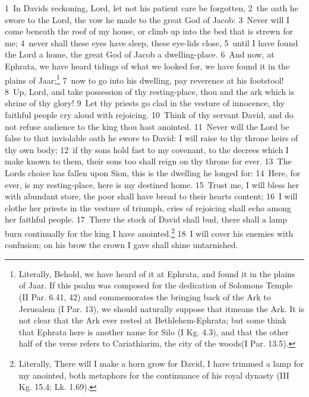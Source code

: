 \documentclass[10pt]{book} %
\begin{document}
\textcolor{benred8}{1}~In David\textquotesingle s reckoning, Lord, let not his patient care be forgotten, \textcolor{benred8}{2}~the oath he swore to the Lord, the vow he made to the great God of Jacob: \textcolor{benred8}{3}~Never will I come beneath the roof of my house, or climb up into the bed that is strewn for me; \textcolor{benred8}{4}~never shall these eyes have sleep, these eye-lids close, \textcolor{benred8}{5}~until I have found the Lord a home, the great God of Jacob a dwelling-place. \textcolor{benred8}{6}~And now, at Ephrata, we have heard tidings of what we looked for, we have found it in the plains of Jaar;\footnote[1]{Literally, \textasciigrave Behold, we have heard of it at Ephrata, and found it in the plains of Jaar\textquotesingle . If this psalm was composed for the dedication of Solomon\textquotesingle s Temple (II Par. 6.41, 42) and commemorates the bringing back of the Ark to Jerusalem (I Par. 13), we should naturally suppose that \textasciigrave it\textquotesingle  means the Ark. It is not clear that the Ark ever rested at Bethlehem-Ephrata; but some think that Ephrata here is another name for Silo (I Kg. 4.3), and that the other half of the verse refers to Cariathiarim, the \textasciigrave city of the woods\textquotesingle  (I Par. 13.5).} \textcolor{benred8}{7}~now to go into his dwelling, pay reverence at his footstool! \textcolor{benred8}{8}~Up, Lord, and take possession of thy resting-place, thou and the ark which is shrine of thy glory! \textcolor{benred8}{9}~Let thy priests go clad in the vesture of innocence, thy faithful people cry aloud with rejoicing.
\textcolor{benred8}{10}~Think of thy servant David, and do not refuse audience to the king thou hast anointed. \textcolor{benred8}{11}~Never will the Lord be false to that inviolable oath he swore to David: I will raise to thy throne heirs of thy own body; \textcolor{benred8}{12}~if thy sons hold fast to my covenant, to the decrees which I make known to them, their sons too shall reign on thy throne for ever. \textcolor{benred8}{13}~The Lord\textquotesingle s choice has fallen upon Sion, this is the dwelling he longed for: \textcolor{benred8}{14}~Here, for ever, is my resting-place, here is my destined home. \textcolor{benred8}{15}~Trust me, I will bless her with abundant store, the poor shall have bread to their heart\textquotesingle s content; \textcolor{benred8}{16}~I will clothe her priests in the vesture of triumph, cries of rejoicing shall echo among her faithful people. \textcolor{benred8}{17}~There the stock of David shall bud, there shall a lamp burn continually for the king I have anointed.\footnote[2]{Literally, \textasciigrave There will I make a horn grow for David, I have trimmed a lamp for my anointed\textquotesingle , both metaphors for the continuance of his royal dynasty (III Kg. 15.4; Lk. 1.69).} \textcolor{benred8}{18}~I will cover his enemies with confusion; on his brow the crown I gave shall shine untarnished.
\end{document}

